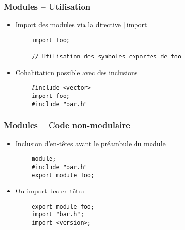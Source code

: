 \documentclass[C++.tex]{subfiles}
\begin{document}
\begin{frame}[fragile]
	\frametitle{Modules -- Utilisation}
	\begin{itemize}
		\item Import des modules via la directive \texttt|import|
	\end{itemize}

	\begin{verbatim}
		import foo;

		// Utilisation des symboles exportes de foo
	\end{verbatim}

	\begin{itemize}
		\item Cohabitation possible avec des inclusions
	\end{itemize}

	\begin{verbatim}
		#include <vector>
		import foo;
		#include "bar.h"
	\end{verbatim}
\end{frame}

\begin{frame}[fragile]
	\frametitle{Modules -- Code non-modulaire}
	\begin{itemize}
		\item Inclusion d'en-têtes avant le préambule du module
	\end{itemize}


	\begin{verbatim}
		module;
		#include "bar.h"
		export module foo;
	\end{verbatim}

	\begin{itemize}
		\item Ou import des en-têtes
	\end{itemize}


	\begin{verbatim}
		export module foo;
		import "bar.h";
		import <version>;
	\end{verbatim}
\end{frame}
\end{document}
